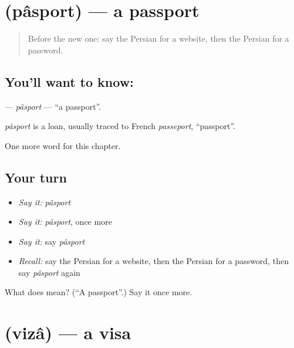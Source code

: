 \section[\texorpdfstring{\fa{پاسپورت} (pâsport)}{پاسپورت (pâsport)}]{ (pâsport) — a passport}

\label{lesson:FA-C168-pasport}



\begin{quote}
Before the new one: say the Persian for a website, then the Persian for a password.
\end{quote}

\subsection*{You'll want to know: }
\textbf{} — \emph{pâsport} — \textquotedblleft{}a passport\textquotedblright{}.

\begin{cousinweb}
\emph{pâsport} is a loan, usually traced to French \emph{passeport}, \textquotedblleft{}passport\textquotedblright{}.
\end{cousinweb}

\begin{grammarlens}[title={What you've built}]
One more word for this chapter.
\end{grammarlens}

\subsection*{Your turn}
\begin{itemize}
\raggedright
  \item \emph{Say it:} \emph{pâsport}
  \item \emph{Say it:} \emph{pâsport}, once more
  \item \emph{Say it:} say \emph{pâsport}
  \item \emph{Recall:} say the Persian for a website, then the Persian for a password, then say \emph{pâsport} again
\end{itemize}

\begin{tcolorbox}[breakable,colback=teal!4,colframe=teal!35!black,title={Before you move on}]
What does  mean? (\textquotedblleft{}A passport\textquotedblright{}.) Say it once more.
\end{tcolorbox}
\section[\texorpdfstring{\fa{ویزا} (vizâ)}{ویزا (vizâ)}]{ (vizâ) — a visa}

